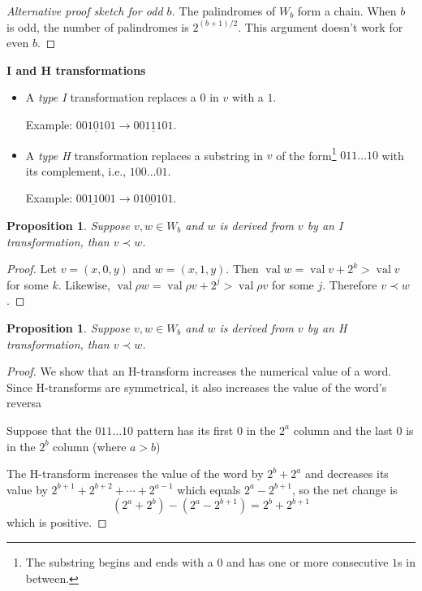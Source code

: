 \documentclass[12pt]{article}
\DeclareMathOperator{\val}{val}
\newtheorem{prop}[conj]{Proposition}
\begin{document}
\begin{proof}[Alternative proof sketch for odd $b$]
  The palindromes of $W_b$ form a chain. When $b$ is odd, the number
  of palindromes is $2^{(b+1)/2}$. This argument doesn't work for
  even $b$.
\end{proof}

\bigbreak
\noindent\textbf{I and H transformations}

\begin{itemize}
\item A \emph{type I} transformation replaces a $0$ in $v$ with a $1$.

  Example: $001\underline0 101 \to 001 \underline1 101$. 

\item A \emph{type H} transformation replaces a substring in $v$ of
  the form\footnote{The substring begins and ends with a $0$ and has
    one or more consecutive $1$s in between.}  $011\dots10$ with its
  complement, i.e., $100\ldots01$.

  Example: $0\underline{0110}01 \to 0 \underline{1001} 01$.
\end{itemize}

\begin{prop}
  Suppose $v,w\in W_b$ and $w$ is derived from $v$ by an I
  transformation, than $v \prec w$.
\end{prop}


\begin{proof}
  Let $v=(x,0,y)$ and $w=(x,1,y)$. Then $\val w = \val v + 2^k > \val
  v$ for some $k$. Likewise, $\val\rho w = \val\rho v + 2^j > \val\rho
  v$ for some $j$. Therefore $v \prec w$.
\end{proof}

\begin{prop}
  Suppose $v,w\in W_b$ and $w$ is derived from $v$ by an H
  transformation, than $v \prec w$.
\end{prop}

\begin{proof}
  We show that an H-transform increases the numerical value of a
  word. Since H-transforms are symmetrical, it also increases the
  value of the word's reversa

  Suppose that the $011\dots10$ pattern  has its first $0$ in the $2^a$
  column and the last $0$ is in the $2^b$ column (where $a>b$)

  The H-transform increases the value of the word by $2^b+2^a$ and
  decreases its value by $2^{b+1} + 2^{b+2} + \cdots + 2^{a-1}$ which
  equals $2^a - 2^{b+1}$, so the net change is
  \[
  \left(2^a+2^b\right) - \left(2^a - 2^{b+1}\right) = 2^b + 2^{b+1}
  \]
  which is positive. 
\end{proof}
\end{document}
